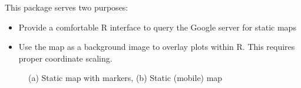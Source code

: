 \documentclass{article}
\begin{document}
\noindent This package serves two purposes:
\begin{itemize}
\item  Provide a comfortable R interface to query the Google server for static maps 
\item Use the map as a background image to overlay plots within R. This requires proper coordinate scaling.
\end{itemize}
\begin{figure}[ht]
    \caption{(a) Static map with markers, (b) Static (mobile) map}
\end{figure}
\end{document}
